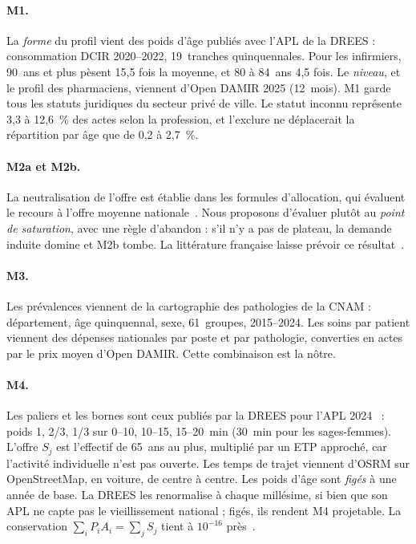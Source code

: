 \documentclass[11pt]{article}
\begin{document}
\paragraph{M1.} La \emph{forme} du profil vient des poids d'âge publiés avec l'APL de la DREES : consommation DCIR
2020--2022, 19~tranches quinquennales. Pour les infirmiers, 90~ans et plus pèsent 15,5 fois la moyenne, et 80 à
84~ans 4,5 fois. Le \emph{niveau}, et le profil des pharmaciens, viennent d'Open DAMIR 2025 (12~mois). M1 garde tous
les statuts juridiques du secteur privé de ville. Le statut inconnu représente 3,3 à 12,6~\%\mesure{} des actes selon
la profession, et l'exclure ne déplacerait la répartition par âge que de 0,2 à 2,7~\%\mesure{}.

\paragraph{M2a et M2b.} La neutralisation de l'offre est établie dans les formules d'allocation, qui évaluent le
recours à l'offre moyenne nationale~\citep{gravelle2003}. Nous proposons d'évaluer plutôt au \emph{point de
saturation}, avec une règle d'abandon : s'il n'y a pas de plateau, la demande induite domine et M2b tombe. La
littérature française laisse prévoir ce résultat~\citep{delattre2003}.

\paragraph{M3.} Les prévalences viennent de la cartographie des pathologies de la CNAM : département, âge quinquennal,
sexe, 61~groupes, 2015--2024. Les soins par patient viennent des dépenses nationales par poste et par pathologie,
converties en actes par le prix moyen d'Open DAMIR. Cette combinaison est la nôtre.

\paragraph{M4.} Les paliers et les bornes sont ceux publiés par la DREES pour l'APL 2024~\citep{vergier2017} : poids
1, 2/3, 1/3 sur 0--10, 10--15, 15--20~min (30~min pour les sages-femmes). L'offre $S_j$ est l'effectif de 65~ans au
plus, multiplié par un ETP approché, car l'activité individuelle n'est pas ouverte. Les temps de trajet viennent
d'OSRM sur OpenStreetMap, en voiture, de centre à centre. Les poids d'âge sont \emph{figés} à une année de base. La
DREES les renormalise à chaque millésime, si bien que son APL ne capte pas le vieillissement national ; figés, ils
rendent M4 projetable. La conservation $\sum_i P_iA_i=\sum_j S_j$ tient à $10^{-16}$\mesure{} près~\citep{paez2019}.
\end{document}
